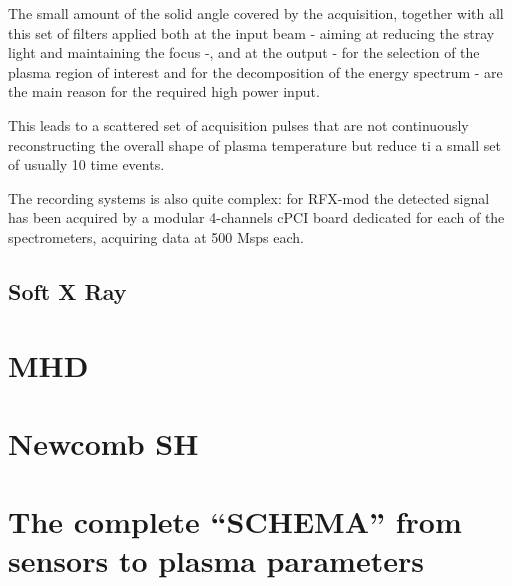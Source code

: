 The small amount of the solid angle covered by the acquisition, together with all this set of filters applied both at the input beam - aiming at reducing the stray light and maintaining the focus -, and at the output - for the selection of the plasma region of interest and for the decomposition of the energy spectrum - are the main reason for the required high power input.

This leads to a scattered set of acquisition pulses that are not continuously reconstructing the overall shape of plasma temperature but reduce ti a small set of usually 10 time events.

The recording systems is also quite complex: for RFX-mod the detected signal has been acquired by a modular 4-channels cPCI board dedicated for each of the spectrometers, acquiring data at 500 Msps each.

\subsection{Soft X Ray}


\section{MHD}

\section{Newcomb SH}

\section{The complete “SCHEMA” from sensors to plasma parameters}
